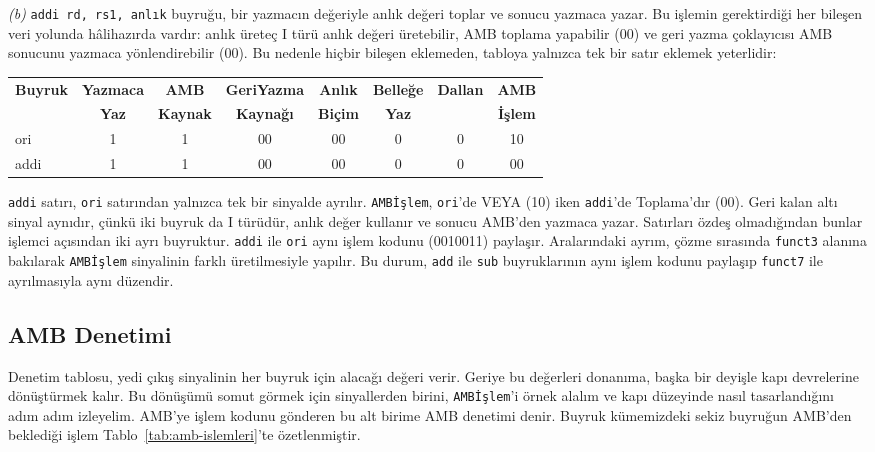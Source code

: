 \begin{ornek}[6.2]
\emph{(b)} \texttt{addi rd, rs1, anlık} buyruğu, bir yazmacın değeriyle anlık değeri toplar ve sonucu yazmaca yazar. Bu işlemin gerektirdiği her bileşen veri yolunda hâlihazırda vardır: anlık üreteç I türü anlık değeri üretebilir, AMB toplama yapabilir (00) ve geri yazma çoklayıcısı AMB sonucunu yazmaca yönlendirebilir (00). Bu nedenle hiçbir bileşen eklemeden, tabloya yalnızca tek bir satır eklemek yeterlidir:

\begin{center}
\small
\begin{tabular}{l|c|c|c|c|c|c|c}
\toprule
\textbf{Buyruk} & \textbf{Yazmaca} & \textbf{AMB} & \textbf{GeriYazma} & \textbf{Anlık} & \textbf{Belleğe} & \textbf{Dallan} & \textbf{AMB} \\
 & \textbf{Yaz} & \textbf{Kaynak} & \textbf{Kaynağı} & \textbf{Biçim} & \textbf{Yaz} & & \textbf{İşlem} \\
\midrule
ori  & 1 & 1 & 00 & 00 & 0 & 0 & 10 \\
addi & 1 & 1 & 00 & 00 & 0 & 0 & 00 \\
\bottomrule
\end{tabular}
\end{center}

\texttt{addi} satırı, \texttt{ori} satırından yalnızca tek bir sinyalde ayrılır. \texttt{AMBİşlem}, \texttt{ori}'de VEYA (10) iken \texttt{addi}'de Toplama'dır (00). Geri kalan altı sinyal aynıdır, çünkü iki buyruk da I türüdür, anlık değer kullanır ve sonucu AMB'den yazmaca yazar. Satırları özdeş olmadığından bunlar işlemci açısından iki ayrı buyruktur. \texttt{addi} ile \texttt{ori} aynı işlem kodunu (0010011) paylaşır. Aralarındaki ayrım, çözme sırasında \texttt{funct3} alanına bakılarak \texttt{AMBİşlem} sinyalinin farklı üretilmesiyle yapılır. Bu durum, \texttt{add} ile \texttt{sub} buyruklarının aynı işlem kodunu paylaşıp \texttt{funct7} ile ayrılmasıyla aynı düzendir.
\end{ornek}

\subsection{AMB Denetimi}
\label{subsec:amb-denetimi}

Denetim tablosu, yedi çıkış sinyalinin her buyruk için alacağı değeri verir. Geriye bu değerleri donanıma, başka bir deyişle kapı devrelerine dönüştürmek kalır. Bu dönüşümü somut görmek için sinyallerden birini, \texttt{AMBİşlem}'i örnek alalım ve kapı düzeyinde nasıl tasarlandığını adım adım izleyelim. AMB'ye işlem kodunu gönderen bu alt birime AMB denetimi denir. Buyruk kümemizdeki sekiz buyruğun AMB'den beklediği işlem Tablo~\ref{tab:amb-islemleri}'te özetlenmiştir.

